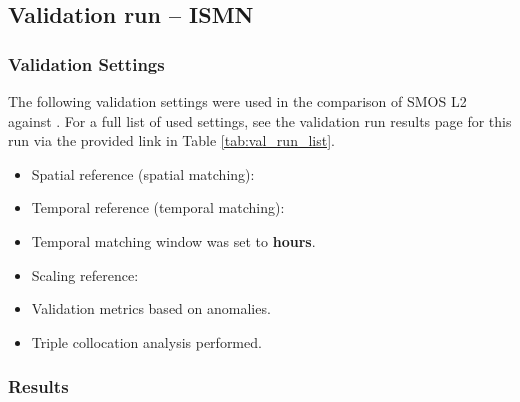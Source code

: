 \subsection{Validation run  -- ISMN}


\subsubsection{Validation Settings}

The following validation settings were used in the comparison of \ac{SMOS} \ac{L2} against .
For a full list of used settings, see the validation run results page for this run via the provided link in Table \ref{tab:val_run_list}.

\begin{itemize}
    \item Spatial reference (spatial matching): \textbf{}
    \item Temporal reference (temporal matching): \textbf{}
    \item Temporal matching window was set to \textbf{ hours}.
    \item Scaling reference: \textbf{}
    \item Validation metrics  based on anomalies.
    \item Triple collocation analysis  performed.
\end{itemize}

\subsubsection{Results}

